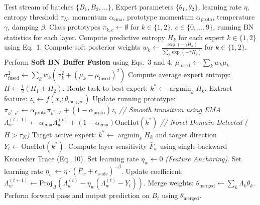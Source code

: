\documentclass{article}
\theoremstyle{plain}
\theoremstyle{definition}
\theoremstyle{remark}
\begin{document}
\begin{algorithm}[tb]
   \caption{Fully Data-Free Dynamic Prototype Adaptation (FDF-DPA)}
   \label{alg:fdf_dpa}
\begin{algorithmic}[1]
    Test stream of batches $\{B_1, B_2, \dots\}$, Expert parameters $\{\theta_1, \theta_2\}$, learning rate $\eta$, entropy threshold $\tau_N$, momentum $\alpha_{\text{ema}}$, prototype momentum $\alpha_{\text{proto}}$, temperature $\gamma$, damping $\beta$.
    Class prototypes $\pi_{k,c} \leftarrow \emptyset$ for $k \in \{1, 2\}$, $c \in \{0,\dots,9\}$, running BN statistics for each layer.
      \STATE Compute predictive entropy $H_k$ for each expert $k \in \{1, 2\}$ using Eq.~1.
      \STATE Compute soft posterior weights $w_k \leftarrow \frac{\exp(-\gamma H_k)}{\sum_j \exp(-\gamma H_j)}$ for $k \in \{1, 2\}$.
      \STATE Perform \textbf{Soft BN Buffer Fusion} using Eqs.~3 and 4:
      \STATE \quad $\mu_{\text{fused}} \leftarrow \sum_k w_k \mu_k$
      \STATE \quad $\sigma_{\text{fused}}^2 \leftarrow \sum_k w_k \left( \sigma_k^2 + (\mu_k - \mu_{\text{fused}})^2 \right)$
      \STATE Compute average expert entropy: $\bar{H} \leftarrow \frac{1}{2} (H_1 + H_2)$.
         \STATE Route task to best expert: $k^* \leftarrow \operatorname{argmin}_k H_k$.
               \STATE Extract feature: $z_i \leftarrow f(x_i; \theta_{\text{merged}})$
               \STATE Update running prototype: $\pi_{k^*,c^*} \leftarrow \alpha_{\text{proto}} \pi_{k^*,c^*} + (1-\alpha_{\text{proto}}) z_i$
            \ENDIF
         \ENDFOR
         \STATE \textit{// Smooth transition using EMA}
            \STATE $\Lambda^{(t+1)}_w \leftarrow \alpha_{\text{ema}} \Lambda^{(t)}_w + (1 - \alpha_{\text{ema}}) \text{OneHot}(k^*)$
         \ENDFOR
      \ELSE
         \STATE \textit{// Novel Domain Detected ($\bar{H} > \tau_N$)}
         \STATE Target active expert: $k^* \leftarrow \operatorname{argmin}_k H_k$ and target direction $Y_t \leftarrow \text{OneHot}(k^*)$.
         \STATE Compute layer sensitivity $\bar{F}_w$ using single-backward Kronecker Trace (Eq.~10).
               \STATE Set learning rate $\eta_w \leftarrow 0$ \textit{(Feature Anchoring)}.
            \ELSE
               \STATE Set learning rate $\eta_w \leftarrow \eta \cdot (\bar{F}_w + \epsilon_{\text{scale}})^{-\beta}$.
            \ENDIF
            \STATE Update coefficient: $\Lambda^{(t+1)}_w \leftarrow \text{Proj}_{\Delta} \left( \Lambda^{(t)}_w - \eta_w (\Lambda^{(t)}_w - Y_t) \right)$.
         \ENDFOR
      \ENDIF
      \STATE Merge weights: $\theta_{\text{merged}} \leftarrow \sum_k \Lambda_k \theta_k$.
      \STATE Perform forward pass and output prediction on $B_t$ using $\theta_{\text{merged}}$.
   \ENDFOR
\end{algorithmic}
\end{algorithm}
\end{document}
